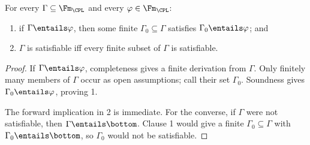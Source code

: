 \begin{theorem}
\label{thm:prop-compactness}
For every \(\Gamma\subseteq\Fm_{\CPL}\) and every
\(\varphi\in\Fm_{\CPL}\):
\begin{enumerate}
  \item if \(\Gamma\entails\varphi\), then some finite
        \(\Gamma_0\subseteq\Gamma\) satisfies
        \(\Gamma_0\entails\varphi\); and
  \item \(\Gamma\) is satisfiable iff every finite subset of \(\Gamma\) is
        satisfiable.
\end{enumerate}
\end{theorem}
\begin{proof}
If \(\Gamma\entails\varphi\), completeness gives a finite derivation from
\(\Gamma\).  Only finitely many members of \(\Gamma\) occur as open
assumptions; call their set \(\Gamma_0\).  Soundness gives
\(\Gamma_0\entails\varphi\), proving 1.

The forward implication in 2 is immediate.  For the converse, if \(\Gamma\)
were not satisfiable, then \(\Gamma\entails\bottom\).  Clause 1 would give a
finite \(\Gamma_0\subseteq\Gamma\) with
\(\Gamma_0\entails\bottom\), so \(\Gamma_0\) would not be satisfiable.
\end{proof}

